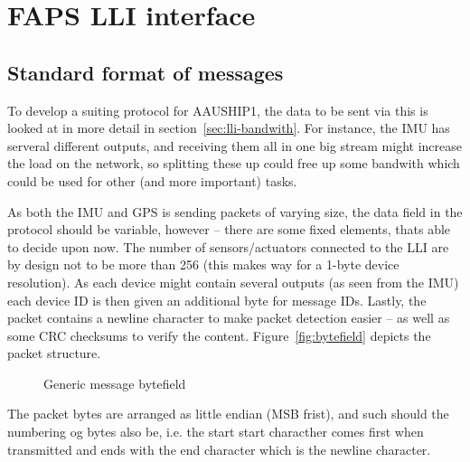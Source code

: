 
\chapter{FAPS LLI interface}
\section{Standard format of messages}
To develop a suiting protocol for AAUSHIP1, the data to be sent via this is looked at in more detail in section~\vref{sec:lli-bandwith}. For instance, the \ac{IMU} has serveral different outputs, and receiving them all in one big stream might increase the load on the network, so splitting these up could free up some bandwith which could be used for other (and more important) tasks. 

As both the \ac{IMU} and \ac{GPS} is sending packets of varying size, the data field in the protocol should be variable, however -- there are some fixed elements, thats able to decide upon now. The number of sensors/actuators connected to the \ac{LLI} are by design not to be more than 256 (this makes way for a 1-byte device resolution). As each device might contain several outputs (as seen from the \ac{IMU}) each device ID is then given an additional byte for message IDs. Lastly, the packet contains a newline character to make packet detection easier -- as well as some \ac{CRC} checksums to verify the content. Figure~\vref{fig:bytefield} depicts the packet structure.


\begin{figure}[h]
\centering
{}
\caption{Generic message bytefield}
\label{fig:bytefield}
\end{figure}

The packet bytes are arranged as little endian (MSB frist), and such should the numbering og bytes also be, i.e. the start start characther comes first when transmitted and ends with the end character which is the newline character.

